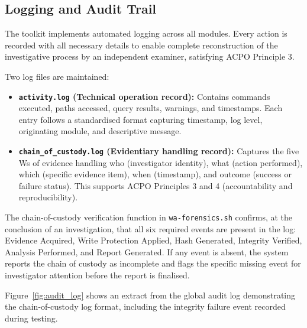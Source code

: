 \documentclass[12pt,a4paper]{report}
\begin{document}
\subsection{Logging and Audit Trail}

The toolkit implements automated logging across all modules. Every action is recorded with all necessary details to enable complete reconstruction of the investigative process by an independent examiner, satisfying ACPO Principle 3.

Two log files are maintained:

\begin{itemize}
    \item \textbf{\texttt{activity.log} (Technical operation record):} Contains commands executed, paths accessed, query results, warnings, and timestamps. Each entry follows a standardised format capturing timestamp, log level, originating module, and descriptive message.

    \item \textbf{\texttt{chain\_of\_custody.log} (Evidentiary handling record):} Captures the five Ws of evidence handling who (investigator identity), what (action performed), which (specific evidence item), when (timestamp), and outcome (success or failure status). This supports ACPO Principles 3 and 4 (accountability and reproducibility).
\end{itemize}

The chain-of-custody verification function in \texttt{wa-forensics.sh} confirms, at the conclusion of an investigation, that all six required events are present in the log: Evidence Acquired, Write Protection Applied, Hash Generated, Integrity Verified, Analysis Performed, and Report Generated. If any event is absent, the system reports the chain of custody as incomplete and flags the specific missing event for investigator attention before the report is finalised.

Figure~\ref{fig:audit_log} shows an extract from the global audit log demonstrating the chain-of-custody log format, including the integrity failure event recorded during testing.

\end{document}
